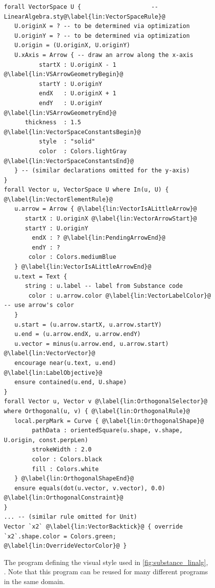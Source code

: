\begin{figure}[p]
\begin{mdframed}[style=STYCode]
\begin{lstlisting}[language=Sty-LA,escapechar=@]
forall VectorSpace U {                    -- LinearAlgebra.sty@\label{lin:VectorSpaceRule}@
   U.originX = ? -- to be determined via optimization
   U.originY = ? -- to be determined via optimization
   U.origin = (U.originX, U.originY)
   U.xAxis = Arrow { -- draw an arrow along the x-axis
          startX : U.originX - 1 @\label{lin:VSArrowGeometryBegin}@
          startY : U.originY
          endX   : U.originX + 1
          endY   : U.originY @\label{lin:VSArrowGeometryEnd}@
      thickness  : 1.5 @\label{lin:VectorSpaceConstantsBegin}@
          style  : "solid"
          color  : Colors.lightGray @\label{lin:VectorSpaceConstantsEnd}@
   } -- (similar declarations omitted for the y-axis)
}
forall Vector u, VectorSpace U where In(u, U) { @\label{lin:VectorElementRule}@            
   u.arrow = Arrow { @\label{lin:VectorIsALittleArrow}@
      startX : U.originX @\label{lin:VectorArrowStart}@
      startY : U.originY
        endX : ? @\label{lin:PendingArrowEnd}@
        endY : ?
       color : Colors.mediumBlue
   } @\label{lin:VectorIsALittleArrowEnd}@
   u.text = Text {
      string : u.label -- label from Substance code
       color : u.arrow.color @\label{lin:VectorLabelColor}@ -- use arrow's color
   }
   u.start = (u.arrow.startX, u.arrow.startY)
   u.end = (u.arrow.endX, u.arrow.endY)
   u.vector = minus(u.arrow.end, u.arrow.start) @\label{lin:VectorVector}@
   encourage near(u.text, u.end) @\label{lin:LabelObjective}@
   ensure contained(u.end, U.shape)
}
forall Vector u, Vector v @\label{lin:OrthogonalSelector}@
where Orthogonal(u, v) { @\label{lin:OrthogonalRule}@
   local.perpMark = Curve { @\label{lin:OrthogonalShape}@
        pathData : orientedSquare(u.shape, v.shape, U.origin, const.perpLen)
        strokeWidth : 2.0
        color : Colors.black
        fill : Colors.white
   } @\label{lin:OrthogonalShapeEnd}@
   ensure equals(dot(u.vector, v.vector), 0.0) @\label{lin:OrthogonalConstraint}@
}
... -- (similar rule omitted for Unit)
Vector `x2` @\label{lin:VectorBacktick}@ { override `x2`.shape.color = Colors.green; @\label{lin:OverrideVectorColor}@ }
\end{lstlisting}
\end{mdframed}
   \vspace{-.5\baselineskip}\caption{The \Style{} program defining the visual style used in \cref{fig:substance_linalg}, . Note that this \Style{} program can be reused for many different \Substance{} programs in the same domain.\label{fig:style_linalg}}
   
\end{figure}


